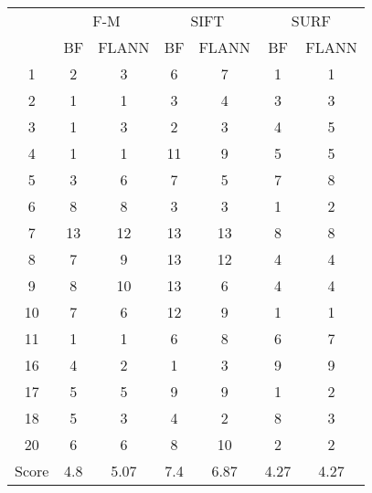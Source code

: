\documentclass[draft,final]{vutinfth} %
\begin{document}
\begin{appendices}
\begin{minipage}{\linewidth}
\centering
\begin{tabular}{c|cc|cc|cc}
\multirow{2}{*}{ } & \multicolumn{2}{c}{ F-M } & \multicolumn{2}{c}{ SIFT } & \multicolumn{2}{c}{ SURF } \\
& BF & FLANN & BF & FLANN & BF & FLANN \\
\hline
1 & 2 & 3 & 6 & 7 & 1 & 1 \\
2 & 1 & 1 & 3 & 4 & 3 & 3 \\
3 & 1 & 3 & 2 & 3 & 4 & 5 \\
4 & 1 & 1 & 11 & 9 & 5 & 5 \\
5 & 3 & 6 & 7 & 5 & 7 & 8 \\
6 & 8 & 8 & 3 & 3 & 1 & 2 \\
7 & 13 & 12 & 13 & 13 & 8 & 8 \\
8 & 7 & 9 & 13 & 12 & 4 & 4 \\
9 & 8 & 10 & 13 & 6 & 4 & 4 \\
10 & 7 & 6 & 12 & 9 & 1 & 1 \\
11 & 1 & 1 & 6 & 8 & 6 & 7 \\
16 & 4 & 2 & 1 & 3 & 9 & 9 \\
17 & 5 & 5 & 9 & 9 & 1 & 2 \\
18 & 5 & 3 & 4 & 2 & 8 & 3 \\
20 & 6 & 6 & 8 & 10 & 2 & 2 \\
\hline
Score & 4.8 & 5.07 & 7.4 & 6.87 & 4.27 & 4.27 \\
\end{tabular}
 \label{tab:20Cent} 
\end{minipage}


\end{appendices}
\end{document}
